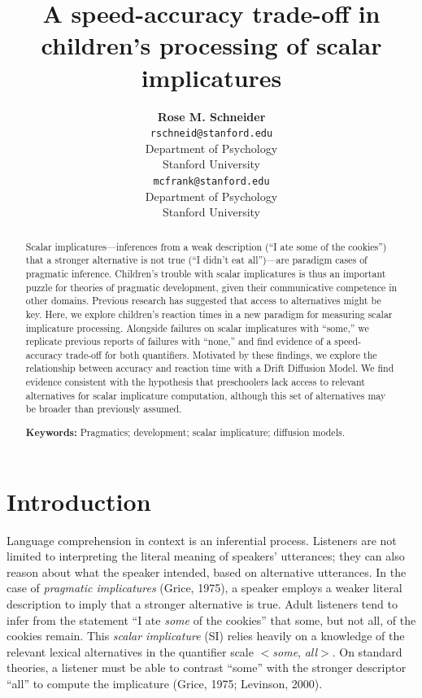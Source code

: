 \documentclass[10pt, letterpaper]{article}
\title{A speed-accuracy trade-off in children's processing of scalar
implicatures}
\author{{\large \bf Rose M. Schneider} \\ \texttt{rschneid@stanford.edu} \\ Department of Psychology \\ Stanford University \And {\large \bf Michael C. Frank} \\ \texttt{mcfrank@stanford.edu} \\ Department of Psychology \\ Stanford University}
\begin{document}
\maketitle

\begin{abstract}
Scalar implicatures---inferences from a weak description (``I ate some
of the cookies'') that a stronger alternative is not true (``I didn't
eat all'')---are paradigm cases of pragmatic inference. Children's
trouble with scalar implicatures is thus an important puzzle for
theories of pragmatic development, given their communicative competence
in other domains. Previous research has suggested that access to
alternatives might be key. Here, we explore children's reaction times in
a new paradigm for measuring scalar implicature processing. Alongside
failures on scalar implicatures with ``some,'' we replicate previous
reports of failures with ``none,'' and find evidence of a speed-accuracy
trade-off for both quantifiers. Motivated by these findings, we explore
the relationship between accuracy and reaction time with a Drift
Diffusion Model. We find evidence consistent with the hypothesis that
preschoolers lack access to relevant alternatives for scalar implicature
computation, although this set of alternatives may be broader than
previously assumed.

\textbf{Keywords:}
Pragmatics; development; scalar implicature; diffusion models.
\end{abstract}

\section{Introduction}\label{introduction}

Language comprehension in context is an inferential process. Listeners
are not limited to interpreting the literal meaning of speakers'
utterances; they can also reason about what the speaker intended, based
on alternative utterances. In the case of \emph{pragmatic implicatures}
(Grice, 1975), a speaker employs a weaker literal description to imply
that a stronger alternative is true. Adult listeners tend to infer from
the statement ``I ate \emph{some} of the cookies'' that some, but not
all, of the cookies remain. This \emph{scalar implicature} (SI) relies
heavily on a knowledge of the relevant lexical alternatives in the
quantifier scale \(<\)\emph{some}, \emph{all}\(>\). On standard
theories, a listener must be able to contrast ``some'' with the stronger
descriptor ``all'' to compute the implicature (Grice, 1975; Levinson,
2000).
\end{document}
